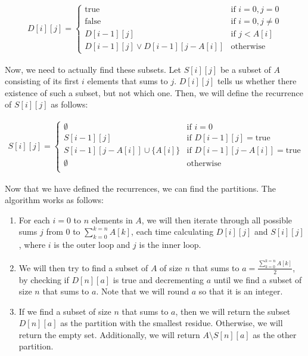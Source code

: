 \documentclass[11pt]{article}
\begin{document}
\begin{align*}
    D[i][j] = \begin{cases}
        \text{true} & \text{if } i=0,j = 0 \\
        \text{false} & \text{if } i = 0, j \neq 0 \\
        D[i-1][j] & \text{if } j < A[i] \\
        D[i-1][j] \lor D[i-1][j-A[i]] & \text{otherwise} 
    \end{cases}
\end{align*}

Now, we need to actually find these subsets. Let $S[i][j]$ be a subset of 
$A$ consisting of its first $i$ elements that sums to $j$. $D[i][j]$ tells us whether there existence of 
such a subset, but not which one. Then, we will define the recurrence of $S[i][j]$ 
as follows:

\begin{align*}
    S[i][j] = \begin{cases}
        \emptyset & \text{if } i=0 \\
        S[i-1][j] & \text{if } D[i-1][j] = \text{true} \\
        S[i-1][j-A[i]] \cup \{A[i]\} & \text{if } D[i-1][j-A[i]] = \text{true} \\ 
        \emptyset & \text{otherwise} \\
    \end{cases}
\end{align*}

Now that we have defined the recurrences, we can find the partitions. The algorithm 
works as follows:

\begin{enumerate}
    \item For each $i = 0$ to $n$ elements in $A$, we will then iterate through all
    possible sums $j$ from $0$ to $\sum_{k=0}^{k=n} A[k]$, each time calculating
    $D[i][j]$ and $S[i][j]$, where $i$ is the outer loop and $j$ is the inner 
    loop. 

    \item We will then try to find a subset of $A$ of size $n$ that sums to 
    $a = \frac{\sum_{k=0}^{k=n} A[k]}{2}$, by checking if $D[n][a]$
    is true and decrementing $a$ until we find a subset of size $n$ 
    that sums to $a$. Note that we will round $a$ so that it is an integer.

    \item If we find a subset of size $n$ that sums to $a$, then we 
    will return the subset $D[n][a]$ as the partition with the smallest
    residue. Otherwise, we will return the empty set. Additionally, we will return 
    $A \setminus S[n][a]$ as the other partition.    

\end{enumerate}
\end{document}
